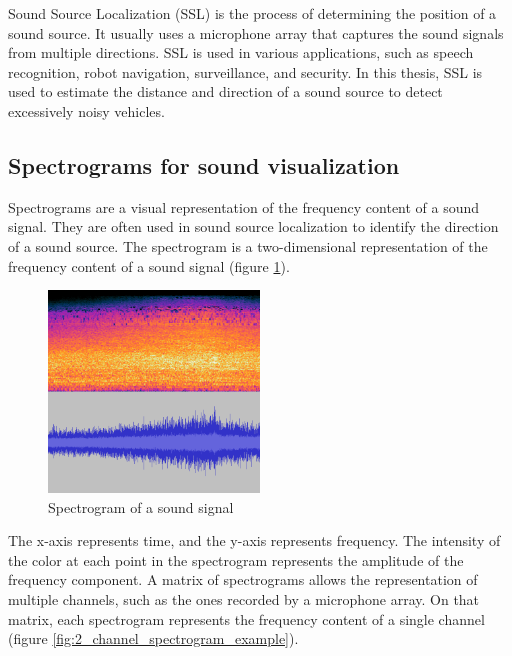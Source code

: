 Sound Source Localization (SSL) is the process of determining the position of a sound source. It usually uses a microphone array that captures the sound signals from multiple directions. SSL is used in various applications, such as speech recognition, robot navigation, surveillance, and security. In this thesis, SSL is used to estimate the distance and direction of a sound source to detect excessively noisy vehicles.

\subsection{Spectrograms for sound visualization}

Spectrograms are a visual representation of the frequency content of a sound signal. They are often used in sound source localization to identify the direction of a sound source. The spectrogram is a two-dimensional representation of the frequency content of a sound signal (figure \ref*{fig:spectrogram_example}).

\begin{figure}[H]
    \centering
    \includegraphics[width=0.5\textwidth]{../Images/spectrogram-example.png}
    \caption{Spectrogram of a sound signal}
    \label{fig:spectrogram_example}
\end{figure}

The x-axis represents time, and the y-axis represents frequency. The intensity of the color at each point in the spectrogram represents the amplitude of the frequency component. A matrix of spectrograms allows the representation of multiple channels, such as the ones recorded by a microphone array. On that matrix, each spectrogram represents the frequency content of a single channel (figure \ref*{fig:2_channel_spectrogram_example}).

